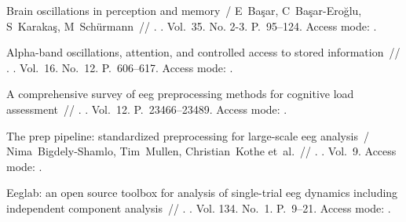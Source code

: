 \expandafter\long\expandafter\gdef\csname fullcite@10.1016/s0167-8760-99-00047-1\endcsname{%
Brain oscillations in perception and memory~/ E~Başar, C~Başar-Eroğlu,
  S~Karakaş, M~Sch\"{u}rmann~//
  \href{http://dx.doi.org/10.1016/s0167-8760(99)00047-1}{}. \BibDash
{}. \BibDash
\newblock Vol.~35. No. 2-3. \BibDash
\newblock P.~95--124. \BibDash
\newblock Access mode:
  .
}

\expandafter\long\expandafter\gdef\csname fullcite@10.1016/j.tics.2012.10.007\endcsname{%
 Alpha-band oscillations, attention, and controlled access
  to stored information~//
  \href{http://dx.doi.org/10.1016/j.tics.2012.10.007}{}. \BibDash
{}. \BibDash
\newblock Vol.~16. No.~12. \BibDash
\newblock P.~606--617. \BibDash
\newblock Access mode: .
}

\expandafter\long\expandafter\gdef\csname fullcite@10.1109/access.2024.3360328\endcsname{%
 A comprehensive survey of eeg
  preprocessing methods for cognitive load assessment~//
  \href{http://dx.doi.org/10.1109/access.2024.3360328}{}.
  \BibDash
{}. \BibDash
\newblock Vol.~12. \BibDash
\newblock P.~23466--23489. \BibDash
\newblock Access mode: .
}

\expandafter\long\expandafter\gdef\csname fullcite@10.3389/fninf.2015.00016\endcsname{%
The prep pipeline: standardized preprocessing for large-scale eeg analysis~/
  Nima~Bigdely-Shamlo, Tim~Mullen, Christian~Kothe et~al.~//
  \href{http://dx.doi.org/10.3389/fninf.2015.00016}{}. \BibDash
{}. \BibDash
\newblock Vol.~9. \BibDash
\newblock Access mode: .
}

\expandafter\long\expandafter\gdef\csname fullcite@10.1016/j.jneumeth.2003.10.009\endcsname{%
 Eeglab: an open source toolbox for analysis of
  single-trial eeg dynamics including independent component analysis~//
  \href{http://dx.doi.org/10.1016/j.jneumeth.2003.10.009}{}. \BibDash
{}. \BibDash
\newblock Vol. 134. No.~1. \BibDash
\newblock P.~9--21. \BibDash
\newblock Access mode:
  .
}

